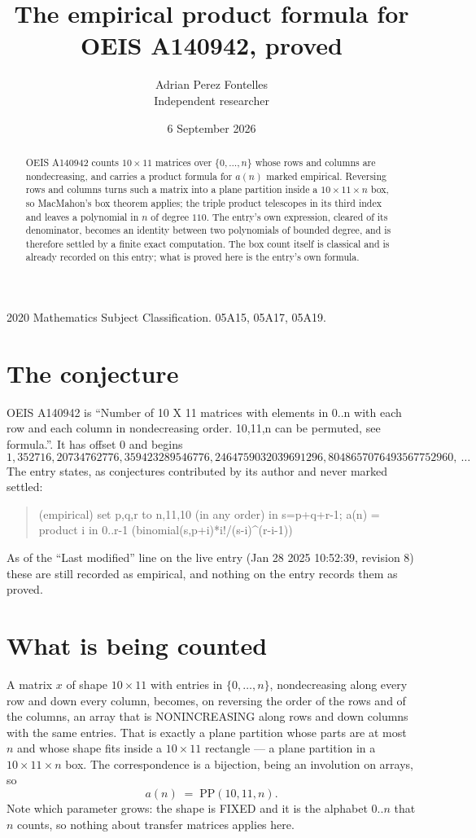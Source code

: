 \documentclass[11pt,a4paper]{article}
\title{The empirical product formula for OEIS A140942, proved}
\author{Adrian Perez Fontelles\\ \small Independent researcher}
\date{6 September 2026}
\theoremstyle{plain}
\theoremstyle{definition}
\begin{document}
\maketitle

\begin{abstract}
OEIS A140942 counts $10\times11$ matrices over $\{0,\dots,n\}$ whose rows and columns are
nondecreasing, and carries a product formula for $a(n)$ marked empirical. Reversing rows and
columns turns such a matrix into a plane partition inside a $10\times11\times n$ box, so
MacMahon's box theorem applies; the triple product telescopes in its third index and leaves a
polynomial in $n$ of degree $110$. The entry's own expression, cleared of its denominator,
becomes an identity between two polynomials of bounded degree, and is therefore settled by a
finite exact computation. The box count itself is classical and is already recorded on this
entry; what is proved here is the entry's own formula.
\end{abstract}

\noindent\small 2020 Mathematics Subject Classification. 05A15, 05A17, 05A19.\normalsize

\section{The conjecture}

OEIS A140942 is ``Number of 10 X 11 matrices with elements in 0..n with each row and each column in nondecreasing order. 10,11,n can be permuted, see formula.''. It has offset $0$ and begins
\[
1, 352716, 20734762776, 359423289546776, 2464759032039691296, 8048657076493567752960,\ \dots
\]
The entry states, as conjectures contributed by its author and never marked settled:
\begin{quote}
(empirical) set p,q,r to n,11,10 (in any order) in s=p+q+r-1; a(n) = product {i in 0..r-1} (binomial(s,p+i)*i!/(s-i)\^{}(r-i-1))

\end{quote}
As of the ``Last modified'' line on the live entry (Jan 28 2025 10:52:39, revision 8) these are still
recorded as empirical, and nothing on the entry records them as proved.

\section{What is being counted}

A matrix $x$ of shape $10\times11$ with entries in $\{0,\dots,n\}$, nondecreasing along
every row and down every column, becomes, on reversing the order of the rows and of the
columns, an array that is NONINCREASING along rows and down columns with the same entries. That
is exactly a plane partition whose parts are at most $n$ and whose shape fits inside a
$10\times11$ rectangle --- a plane partition in a $10\times11\times n$ box. The
correspondence is a bijection, being an involution on arrays, so
\[
a(n)\;=\;\mathrm{PP}(10,11,n).
\]
Note which parameter grows: the shape is FIXED and it is the alphabet $0..n$ that $n$ counts,
so nothing about transfer matrices applies here.
\end{document}
